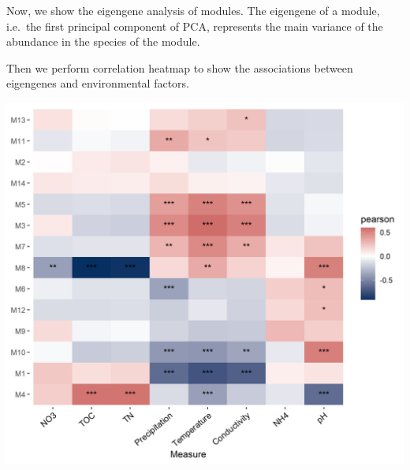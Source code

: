 \documentclass[
]{book}
\newenvironment{Shaded}{\begin{snugshade}}{\end{snugshade}}
\newcommand{\AttributeTok}[1]{\textcolor[rgb]{0.77,0.63,0.00}{#1}}
\newcommand{\CommentTok}[1]{\textcolor[rgb]{0.56,0.35,0.01}{\textit{#1}}}
\newcommand{\DecValTok}[1]{\textcolor[rgb]{0.00,0.00,0.81}{#1}}
\newcommand{\FunctionTok}[1]{\textcolor[rgb]{0.00,0.00,0.00}{#1}}
\newcommand{\NormalTok}[1]{#1}
\newcommand{\OtherTok}[1]{\textcolor[rgb]{0.56,0.35,0.01}{#1}}
\newcommand{\SpecialCharTok}[1]{\textcolor[rgb]{0.00,0.00,0.00}{#1}}
\begin{document}
Now, we show the eigengene analysis of modules.
The eigengene of a module, i.e.~the first principal component of PCA, represents the main variance of the abundance in the species of the module.

\begin{Shaded}
\end{Shaded}

Then we perform correlation heatmap to show the associations between eigengenes and environmental factors.

\begin{Shaded}
\end{Shaded}

\begin{center}\includegraphics[width=600px]{Images/trans_network_env_module_eigen} \end{center}
\end{document}
